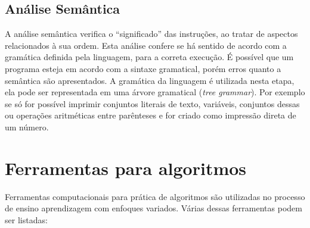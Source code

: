 \subsection{Análise Semântica}

A análise semântica verifica o ``significado'' das instruções, ao tratar de aspectos relacionados à sua ordem. Esta análise confere se há sentido de acordo com a gramática definida pela linguagem, para a correta execução. É possível que um programa esteja em acordo com a sintaxe gramatical, porém erros quanto a semântica são apresentados. A gramática da linguagem é utilizada nesta etapa, ela pode ser representada em uma árvore gramatical (\textit{tree grammar}). Por exemplo se só for possível imprimir conjuntos literais de texto, variáveis, conjuntos dessas ou operações aritméticas entre parênteses e for criado como impressão direta de um número.

\section{Ferramentas para algoritmos}

Ferramentas computacionais para prática de algoritmos são utilizadas no processo de ensino aprendizagem com enfoques variados. Várias dessas ferramentas podem ser listadas:

